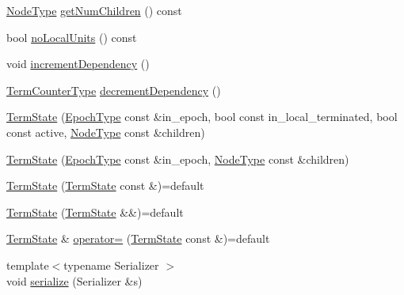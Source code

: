 \begin{DoxyCompactItemize}
\item 
\hyperlink{namespacevt_a866da9d0efc19c0a1ce79e9e492f47e2}{Node\+Type} \hyperlink{structvt_1_1term_1_1_term_state_ac3b42954f6cc609be8a40639e8a9a9a9}{get\+Num\+Children} () const
\item 
bool \hyperlink{structvt_1_1term_1_1_term_state_a6fd3b2a3c99002110ed7cfea8e30f021}{no\+Local\+Units} () const
\item 
void \hyperlink{structvt_1_1term_1_1_term_state_a109f0e5a978106ca6b8de01c5678b621}{increment\+Dependency} ()
\item 
\hyperlink{namespacevt_1_1term_a4fd378cdb0c36683afc1b3399d685f7f}{Term\+Counter\+Type} \hyperlink{structvt_1_1term_1_1_term_state_addc61edaf5b324db422a7e857890b314}{decrement\+Dependency} ()
\item 
\hyperlink{structvt_1_1term_1_1_term_state_a6949c80d5206b322eb0034ad17aa0ad0}{Term\+State} (\hyperlink{namespacevt_a985a5adf291c34a3ca263b3378388236}{Epoch\+Type} const \&in\+\_\+epoch, bool const in\+\_\+local\+\_\+terminated, bool const active, \hyperlink{namespacevt_a866da9d0efc19c0a1ce79e9e492f47e2}{Node\+Type} const \&children)
\item 
\hyperlink{structvt_1_1term_1_1_term_state_a07b3f0ad915aee5a30d526e6172f3f90}{Term\+State} (\hyperlink{namespacevt_a985a5adf291c34a3ca263b3378388236}{Epoch\+Type} const \&in\+\_\+epoch, \hyperlink{namespacevt_a866da9d0efc19c0a1ce79e9e492f47e2}{Node\+Type} const \&children)
\item 
\hyperlink{structvt_1_1term_1_1_term_state_a5a4f1285d03b0a2b1934e61bceb352c3}{Term\+State} (\hyperlink{structvt_1_1term_1_1_term_state}{Term\+State} const \&)=default
\item 
\hyperlink{structvt_1_1term_1_1_term_state_ae3b24cd9d0097422d6e1a35fc169fe4b}{Term\+State} (\hyperlink{structvt_1_1term_1_1_term_state}{Term\+State} \&\&)=default
\item 
\hyperlink{structvt_1_1term_1_1_term_state}{Term\+State} \& \hyperlink{structvt_1_1term_1_1_term_state_ac440f590ac59cb7c5b9560ca760fbc69}{operator=} (\hyperlink{structvt_1_1term_1_1_term_state}{Term\+State} const \&)=default
\item 
{\footnotesize template$<$typename Serializer $>$ }\\void \hyperlink{structvt_1_1term_1_1_term_state_adb41f4c46d2c270df3ccfcb479f9943d}{serialize} (Serializer \&s)
\end{DoxyCompactItemize}
